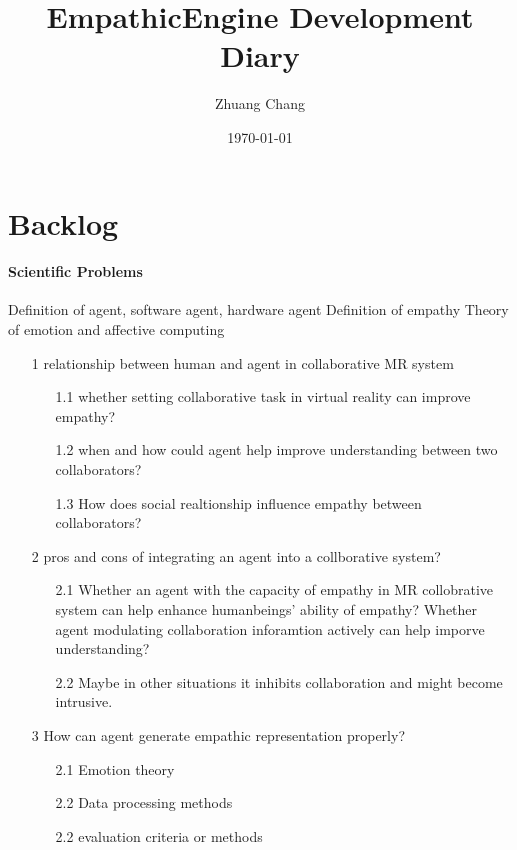 \documentclass{article}
\begin{document}
\title{EmpathicEngine Development Diary}
\author{Zhuang Chang}
\date{\today}

\maketitle


\tableofcontents
\section{Backlog}
\paragraph{Scientific Problems}

Definition of agent, software agent, hardware agent
Definition of empathy
Theory of emotion and affective computing

\begin{enumerate}
\item[1] relationship between human and agent in collaborative MR system
\begin{enumerate}
    \item[1.1]whether setting collaborative task in virtual reality can improve empathy? 
    \item[1.2]when and how could agent help improve understanding between two collaborators?
    \item[1.3] How does social realtionship influence empathy between collaborators?
 
\end{enumerate} 

\item[2]pros and cons of integrating an agent into a collborative system?
\begin{enumerate}
    \item[2.1]Whether an agent with the capacity of empathy in MR collobrative system can help 
    enhance humanbeings' ability of empathy? Whether agent modulating collaboration inforamtion actively can help imporve understanding?
    \item[2.2]Maybe in other situations it inhibits collaboration and might become intrusive.
 
\end{enumerate} 

\item[3]How can agent generate empathic representation properly?
\begin{enumerate}
    \item[2.1]Emotion theory
    \item[2.2]Data processing methods 
    \item[2.2]evaluation criteria or methods
 
\end{enumerate} 


\end{enumerate}
\end{document}

